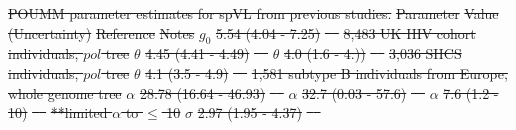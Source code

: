 \documentclass[12pt]{article} %
\providecommand{\DIFdel}[1]{{\protect\color{red}\sout{#1}}}                      %
\providecommand{\DIFdelFL}[1]{\DIFdel{#1}} %
\begin{document}
{%
\DIFdelFL{POUMM parameter estimates for spVL from previous studies.}}
\DIFdelFL{Parameter }%
\DIFdelFL{Value (Uncertainty) }%
\DIFdelFL{Reference }%
\DIFdelFL{Notes }%
\DIFdelFL{$g_0$ }%
\DIFdelFL{5.54 (4.04 - 7.25) }%
\DIFdelFL{\mbox{%
\citet{Mitov2018} }\hskip0pt%
}%
\DIFdelFL{8,483 UK HIV cohort individuals, $pol$ tree }%
\DIFdelFL{$\theta$ }%
\DIFdelFL{4.45 (4.41 - 4.49) }%
\DIFdelFL{\mbox{%
\citet{Mitov2018} }\hskip0pt%
}%
\DIFdelFL{$\theta$ }%
\DIFdelFL{4.0 (1.6 - 4.)) }%
\DIFdelFL{\mbox{%
\citet{Bertels2018} }\hskip0pt%
}%
\DIFdelFL{3,036 SHCS individuals, $pol$ tree }%
\DIFdelFL{$\theta$ }%
\DIFdelFL{4.1 (3.5 - 4.9) }%
\DIFdelFL{\mbox{%
\citet{Blanquart2017} }\hskip0pt%
}%
\DIFdelFL{1,581 subtype B individuals from Europe, whole genome tree }%
\DIFdelFL{$\alpha$ }%
\DIFdelFL{28.78 (16.64 - 46.93) }%
\DIFdelFL{\mbox{%
\citet{Mitov2018} }\hskip0pt%
}%
\DIFdelFL{$\alpha$ }%
\DIFdelFL{32.7 (0.03 - 57.6) }%
\DIFdelFL{\mbox{%
\citet{Bertels2018} }\hskip0pt%
}%
\DIFdelFL{$\alpha$ }%
\DIFdelFL{7.6 (1.2 - 10) }%
\DIFdelFL{\mbox{%
\citet{Blanquart2017} }\hskip0pt%
}%
\DIFdelFL{**limited $\alpha$ to $\le$ 10 }%
\DIFdelFL{$\sigma$ }%
\DIFdelFL{2.97 (1.95 - 4.37) }%
\DIFdelFL{\mbox{%
\citet{Mitov2018} }\hskip0pt%
}%
\end{document}
